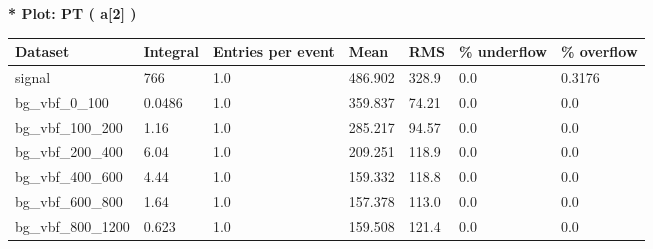 \documentclass[a4paper, 10pt]{article}
\begin{document}
\textbf{* Plot: PT ( a[2] ) }\\
   \begin{table}[H]
  \begin{center}
    \begin{tabular}{|m{23.0mm}|m{23.0mm}|m{18.0mm}|m{19.0mm}|m{19.0mm}|m{19.0mm}|m{19.0mm}|}
      \hline
      {\cellcolor{yellow}         Dataset}& {\cellcolor{yellow}         Integral}& {\cellcolor{yellow}         Entries per event}& {\cellcolor{yellow}         Mean}& {\cellcolor{yellow}         RMS}& {\cellcolor{yellow}         \% underflow}& {\cellcolor{yellow}         \% overflow}\\
      \hline
      {\cellcolor{white}         signal}& {\cellcolor{white}         766}& {\cellcolor{white}         1.0}& {\cellcolor{white}         486.902}& {\cellcolor{white}         328.9}& {\cellcolor{green}         0.0}& {\cellcolor{green}         0.3176}\\
      \hline
      {\cellcolor{white}         bg\_vbf\_0\_100}& {\cellcolor{white}         0.0486}& {\cellcolor{white}         1.0}& {\cellcolor{white}         359.837}& {\cellcolor{white}         74.21}& {\cellcolor{green}         0.0}& {\cellcolor{green}         0.0}\\
      \hline
      {\cellcolor{white}         bg\_vbf\_100\_200}& {\cellcolor{white}         1.16}& {\cellcolor{white}         1.0}& {\cellcolor{white}         285.217}& {\cellcolor{white}         94.57}& {\cellcolor{green}         0.0}& {\cellcolor{green}         0.0}\\
      \hline
      {\cellcolor{white}         bg\_vbf\_200\_400}& {\cellcolor{white}         6.04}& {\cellcolor{white}         1.0}& {\cellcolor{white}         209.251}& {\cellcolor{white}         118.9}& {\cellcolor{green}         0.0}& {\cellcolor{green}         0.0}\\
      \hline
      {\cellcolor{white}         bg\_vbf\_400\_600}& {\cellcolor{white}         4.44}& {\cellcolor{white}         1.0}& {\cellcolor{white}         159.332}& {\cellcolor{white}         118.8}& {\cellcolor{green}         0.0}& {\cellcolor{green}         0.0}\\
      \hline
      {\cellcolor{white}         bg\_vbf\_600\_800}& {\cellcolor{white}         1.64}& {\cellcolor{white}         1.0}& {\cellcolor{white}         157.378}& {\cellcolor{white}         113.0}& {\cellcolor{green}         0.0}& {\cellcolor{green}         0.0}\\
      \hline
      {\cellcolor{white}         bg\_vbf\_800\_1200}& {\cellcolor{white}         0.623}& {\cellcolor{white}         1.0}& {\cellcolor{white}         159.508}& {\cellcolor{white}         121.4}& {\cellcolor{green}         0.0}& {\cellcolor{green}         0.0}\\

\end{tabular}
\end{center}
\end{table}
\end{document}
